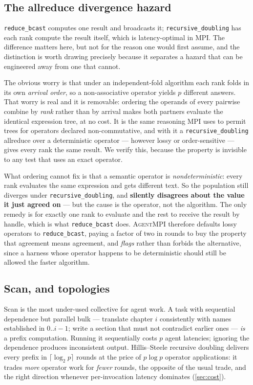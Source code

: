 \documentclass[10pt,twocolumn]{article}
\theoremstyle{definition}
\theoremstyle{plain}
\newcommand{\ampi}{\textsc{AgentMPI}}
\newcommand{\code}[1]{\texttt{\small #1}}
\begin{document}
\subsection{The allreduce divergence hazard}

\code{reduce\_bcast} computes one result and broadcasts it; \code{recursive\_doubling}
has each rank compute the result itself, which is latency-optimal in MPI. The
difference matters here, but not for the reason one would first assume, and the
distinction is worth drawing precisely because it separates a hazard that can be
engineered away from one that cannot.

The obvious worry is that under an independent-fold algorithm each rank folds in its
own \emph{arrival order}, so a non-associative operator yields $p$ different answers.
That worry is real and it is removable: ordering the operands of every pairwise
combine by \emph{rank} rather than by arrival makes both partners evaluate the
identical expression tree, at no cost. It is the same reasoning MPI uses to permit
trees for operators declared non-commutative, and with it a
\code{recursive\_doubling} allreduce over a deterministic operator --- however lossy
or order-sensitive --- gives every rank the same result. We verify this, because the
property is invisible to any test that uses an exact operator.

What ordering cannot fix is that a semantic operator is \emph{nondeterministic}:
every rank evaluates the same expression and gets different text. So the population
still diverges under \code{recursive\_doubling}, and \textbf{silently disagrees
about the value it just agreed on} --- but the cause is the operator, not the
algorithm. The only remedy is for exactly one rank to evaluate and the rest to
receive the result by handle, which is what \code{reduce\_bcast} does. \ampi{}
therefore defaults lossy operators to \code{reduce\_bcast}, paying a factor of two
in rounds to buy the property that agreement means agreement, and \emph{flags}
rather than forbids the alternative, since a harness whose operator happens to be
deterministic should still be allowed the faster algorithm.

\subsection{Scan, and topologies}

Scan is the most under-used collective for agent work. A task with sequential
dependence but parallel bulk --- translate chapter $i$ consistently with names
established in $0..i{-}1$; write a section that must not contradict earlier ones ---
\emph{is} a prefix computation. Running it sequentially costs $p$ agent latencies;
ignoring the dependence produces inconsistent output. Hillis--Steele recursive
doubling delivers every prefix in $\lceil\log_2 p\rceil$ rounds at the price of
$p\log p$ operator applications: it trades \emph{more} operator work for
\emph{fewer} rounds, the opposite of the usual trade, and the right direction
whenever per-invocation latency dominates (\cref{sec:cost}).
\end{document}
